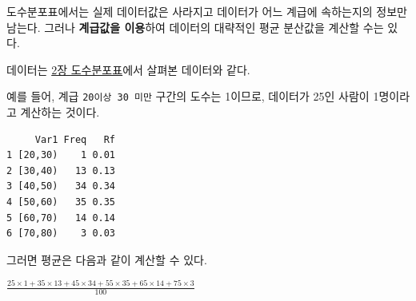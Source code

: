 \documentclass[
  letterpaper,
  DIV=11,
  numbers=noendperiod]{scrreprt}
\newenvironment{Shaded}{\begin{snugshade}}{\end{snugshade}}
\newcommand{\AttributeTok}[1]{\textcolor[rgb]{0.40,0.45,0.13}{#1}}
\newcommand{\CommentTok}[1]{\textcolor[rgb]{0.37,0.37,0.37}{#1}}
\newcommand{\ConstantTok}[1]{\textcolor[rgb]{0.56,0.35,0.01}{#1}}
\newcommand{\DecValTok}[1]{\textcolor[rgb]{0.68,0.00,0.00}{#1}}
\newcommand{\FunctionTok}[1]{\textcolor[rgb]{0.28,0.35,0.67}{#1}}
\newcommand{\NormalTok}[1]{\textcolor[rgb]{0.00,0.23,0.31}{#1}}
\newcommand{\OtherTok}[1]{\textcolor[rgb]{0.00,0.23,0.31}{#1}}
\newcommand{\SpecialCharTok}[1]{\textcolor[rgb]{0.37,0.37,0.37}{#1}}
\begin{document}
도수분포표에서는 실제 데이터값은 사라지고 데이터가 어느 계급에
속하는지의 정보만 남는다. 그러나 \textbf{계급값을 이용}하여 데이터의
대략적인 평균 분산값을 계산할 수는 있다.

데이터는
\href{https://sungileo.github.io/mine_statistics/01_descriptive_statistics/freq_table.html}{2장
도수분포표}에서 살펴본 데이터와 같다.

예를 들어, 계급 \texttt{20이상\ 30\ 미만} 구간의 도수는 1이므로,
데이터가 25인 사람이 1명이라고 계산하는 것이다.

\begin{Shaded}
\end{Shaded}

\begin{verbatim}
     Var1 Freq   Rf
1 [20,30)    1 0.01
2 [30,40)   13 0.13
3 [40,50)   34 0.34
4 [50,60)   35 0.35
5 [60,70)   14 0.14
6 [70,80)    3 0.03
\end{verbatim}

그러면 평균은 다음과 같이 계산할 수 있다.

\(\frac{25\times1+35\times13+45\times34+55\times35+65\times14+75\times3}{100}\)

\begin{Shaded}
\end{Shaded}
\end{document}
